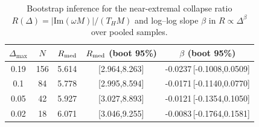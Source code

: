 \begin{table}[t]
\centering
\begin{tabular}{ccccc}
\hline\hline
$\Delta_{\max}$ & $N$ & $R_{\rm med}$ & $R_{\rm med}$ (boot 95\%) & $\beta$ (boot 95\%) \\
\hline
0.19 & 156 & 5.614 & [2.964,8.263] & -0.0237\,[-0.1008,0.0509] \\
0.1 & 84 & 5.778 & [2.995,8.594] & -0.0171\,[-0.1140,0.0770] \\
0.05 & 42 & 5.927 & [3.027,8.893] & -0.0121\,[-0.1354,0.1050] \\
0.02 & 18 & 6.071 & [3.046,9.255] & -0.0083\,[-0.1764,0.1581] \\
\hline\hline
\end{tabular}
\caption{Bootstrap inference for the near-extremal collapse ratio $R(\Delta)=|\mathrm{Im}(\omega M)|/(T_H M)$ and log--log slope $\beta$ in $R\propto \Delta^{\beta}$ over pooled samples.}
\label{tab:ratio_collapse_inference}
\end{table}
